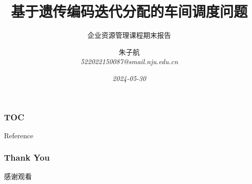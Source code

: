 \documentclass{njupre/njupre}
\title[title] {基于遗传编码迭代分配的车间调度问题}
\subtitle{企业资源管理课程期末报告}
\author[Zhu Zihang]{\texorpdfstring{朱子航 \\ \smallskip \textit{522022150087@smail.nju.edu.cn}}{}}
\date[2024-05-30]{\textit{2024-05-30}}
\begin{document}
\begin{frame}
    \titlepage 
\end{frame}
\begin{frame}
    \frametitle{TOC}
    \tableofcontents 
\end{frame}


\begin{frame}[allowframebreaks]{Reference}
    
    
\end{frame}
\begin{frame}
    \frametitle{Thank You}
    感谢观看
\end{frame}
\end{document}
